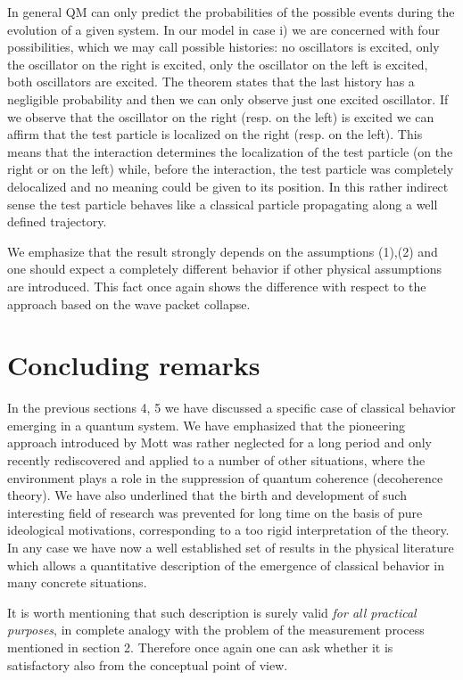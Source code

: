 \documentclass[12pt,reqno]{amsart}
\newcommand{\n}{\relax}
\newcommand{\vs}{\vspace{0.5cm}}
\numberwithin{equation}{section}
\begin{document}
\n
In general QM can only predict  the probabilities of the possible events during the evolution of  a given system. In our model in case i) we are concerned with four possibilities, which we may call possible histories:  no oscillators is excited, only the oscillator on the right is excited, only the oscillator on the left is excited, both oscillators are excited. The theorem states that the last history has a negligible probability and then we can only observe just one excited oscillator. If we observe that the oscillator on the right (resp. on the left) is excited we can affirm that the test particle is localized on the right (resp. on the left). This means that  the interaction determines the localization of the test particle (on the right or on the left) while, before the interaction, the test particle was completely delocalized and no meaning could be given to its position. In this rather indirect sense the test particle behaves like a classical particle propagating along a well defined trajectory.

\n
We emphasize that the result strongly depends on the assumptions (1),(2) and one should expect a completely different behavior if other physical assumptions are introduced.  
This fact once again shows the difference with respect to the approach based on the wave packet collapse.




\vs
\vs
\section{Concluding remarks} 

\vs
\n
In the previous sections 4, 5 we have discussed a specific case of classical behavior emerging in a quantum system. We have emphasized  that the pioneering approach introduced by  Mott was  rather neglected  for a long period and only  recently  rediscovered and applied to a number of other situations, where the environment plays a role in the suppression of quantum coherence (decoherence theory). 
We have also underlined that the birth and development of such interesting field of research was prevented for long time on the basis of pure ideological motivations, corresponding to a too rigid interpretation of the theory. 
In any case we have now a well established set of results in the physical literature which allows a  quantitative description of the emergence of classical behavior in many concrete situations.

\n
It is worth mentioning that such description  is surely valid {\em for all practical purposes}, in complete analogy with 
the problem of the measurement process mentioned in section 2. Therefore once again one can ask whether it is satisfactory also from the conceptual point of view.
\end{document}
